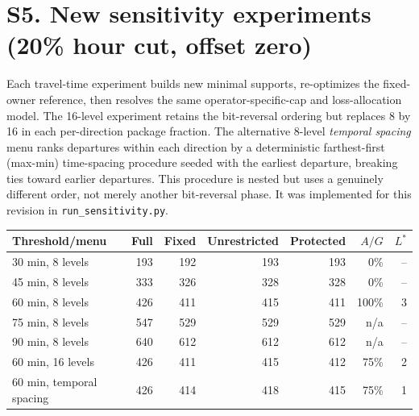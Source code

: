 \documentclass[10pt]{article}
\newcommand{\st}[1]{\texttt{\footnotesize #1}}
\begin{document}
\section*{S5. New sensitivity experiments (20\% hour cut, offset zero)}
Each travel-time experiment builds new minimal supports, re-optimizes the fixed-owner reference, then resolves the same operator-specific-cap and loss-allocation model. The 16-level experiment retains the bit-reversal ordering but replaces 8 by 16 in each per-direction package fraction. The alternative 8-level \emph{temporal spacing} menu ranks departures within each direction by a deterministic farthest-first (max-min) time-spacing procedure seeded with the earliest departure, breaking ties toward earlier departures. This procedure is nested but uses a genuinely different order, not merely another bit-reversal phase. It was implemented for this revision in \st{run\_sensitivity.py}.

\begin{center}\small
\begin{tabular}{@{}lrrrrrr@{}}\toprule
Threshold/menu & Full & Fixed & Unrestricted & Protected & $A/G$ & $L^*$\\\midrule
30 min, 8 levels & 193 & 192 & 193 & 193 & 0\% & --\\
45 min, 8 levels & 333 & 326 & 328 & 328 & 0\% & --\\
60 min, 8 levels & 426 & 411 & 415 & 411 & 100\% & 3\\
75 min, 8 levels & 547 & 529 & 529 & 529 & n/a & --\\
90 min, 8 levels & 640 & 612 & 612 & 612 & n/a & --\\
60 min, 16 levels & 426 & 411 & 415 & 412 & 75\% & 2\\
60 min, temporal spacing & 426 & 414 & 418 & 415 & 75\% & 1\\
\bottomrule\end{tabular}
\end{center}
\end{document}
